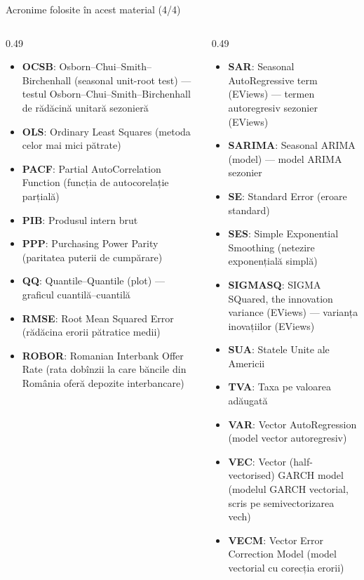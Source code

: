 \begin{frame}{Acronime folosite în acest material (4/4)}
\begin{columns}[T]
\begin{column}{0.49\textwidth}
\begin{itemize}\setlength{\itemsep}{0pt}
    \item \textbf{OCSB}: Osborn–Chui–Smith–Birchenhall (seasonal unit-root test) — testul Osborn–Chui–Smith–Birchenhall de rădăcină unitară sezonieră
    \item \textbf{OLS}: Ordinary Least Squares (metoda celor mai mici pătrate)
    \item \textbf{PACF}: Partial AutoCorrelation Function (funcția de autocorelație parțială)
    \item \textbf{PIB}: Produsul intern brut
    \item \textbf{PPP}: Purchasing Power Parity (paritatea puterii de cumpărare)
    \item \textbf{QQ}: Quantile–Quantile (plot) — graficul cuantilă–cuantilă
    \item \textbf{RMSE}: Root Mean Squared Error (rădăcina erorii pătratice medii)
    \item \textbf{ROBOR}: Romanian Interbank Offer Rate (rata dobînzii la care băncile din România oferă depozite interbancare)
\end{itemize}
\end{column}
\begin{column}{0.49\textwidth}
\begin{itemize}\setlength{\itemsep}{0pt}
    \item \textbf{SAR}: Seasonal AutoRegressive term (EViews) — termen autoregresiv sezonier (EViews)
    \item \textbf{SARIMA}: Seasonal ARIMA (model) — model ARIMA sezonier
    \item \textbf{SE}: Standard Error (eroare standard)
    \item \textbf{SES}: Simple Exponential Smoothing (netezire exponențială simplă)
    \item \textbf{SIGMASQ}: SIGMA SQuared, the innovation variance (EViews) — varianța inovațiilor (EViews)
    \item \textbf{SUA}: Statele Unite ale Americii
    \item \textbf{TVA}: Taxa pe valoarea adăugată
    \item \textbf{VAR}: Vector AutoRegression (model vector autoregresiv)
    \item \textbf{VEC}: Vector (half-vectorised) GARCH model (modelul GARCH vectorial, scris pe semivectorizarea vech)
    \item \textbf{VECM}: Vector Error Correction Model (model vectorial cu corecția erorii)
\end{itemize}
\end{column}
\end{columns}
\end{frame}

